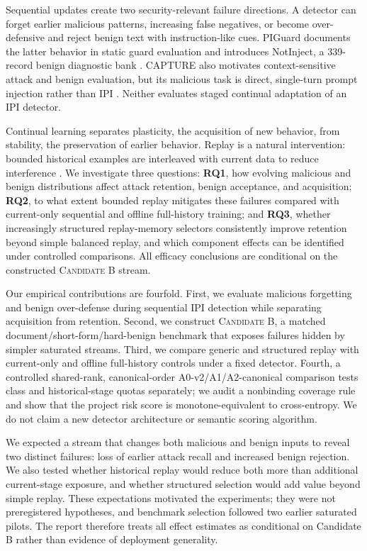 \documentclass[conference]{IEEEtran}
\newcommand{\candb}{\textsc{Candidate B}}
\begin{document}
Sequential updates create two security-relevant failure directions. A detector can forget earlier malicious patterns, increasing false negatives, or become over-defensive and reject benign text with instruction-like cues. PIGuard documents the latter behavior in static guard evaluation and introduces NotInject, a 339-record benign diagnostic bank \cite{li2025piguard}. CAPTURE also motivates context-sensitive attack and benign evaluation, but its malicious task is direct, single-turn prompt injection rather than IPI \cite{kholkar2025capture}. Neither evaluates staged continual adaptation of an IPI detector.

Continual learning separates plasticity, the acquisition of new behavior, from stability, the preservation of earlier behavior. Replay is a natural intervention: bounded historical examples are interleaved with current data to reduce interference \cite{rolnick2019experience,buzzega2020dark,buzzega2020rethinking}. We investigate three questions: \textbf{RQ1}, how evolving malicious and benign distributions affect attack retention, benign acceptance, and acquisition; \textbf{RQ2}, to what extent bounded replay mitigates these failures compared with current-only sequential and offline full-history training; and \textbf{RQ3}, whether increasingly structured replay-memory selectors consistently improve retention beyond simple balanced replay, and which component effects can be identified under controlled comparisons. All efficacy conclusions are conditional on the constructed \candb{} stream.

Our empirical contributions are fourfold. First, we evaluate malicious forgetting and benign over-defense during sequential IPI detection while separating acquisition from retention. Second, we construct \candb{}, a matched document/short-form/hard-benign benchmark that exposes failures hidden by simpler saturated streams. Third, we compare generic and structured replay with current-only and offline full-history controls under a fixed detector. Fourth, a controlled shared-rank, canonical-order A0-v2/A1/A2-canonical comparison tests class and historical-stage quotas separately; we audit a nonbinding coverage rule and show that the project risk score is monotone-equivalent to cross-entropy. We do not claim a new detector architecture or semantic scoring algorithm.

We expected a stream that changes both malicious and benign inputs to reveal two distinct failures: loss of earlier attack recall and increased benign rejection. We also tested whether historical replay would reduce both more than additional current-stage exposure, and whether structured selection would add value beyond simple replay. These expectations motivated the experiments; they were not preregistered hypotheses, and benchmark selection followed two earlier saturated pilots. The report therefore treats all effect estimates as conditional on Candidate B rather than evidence of deployment generality.
\end{document}
